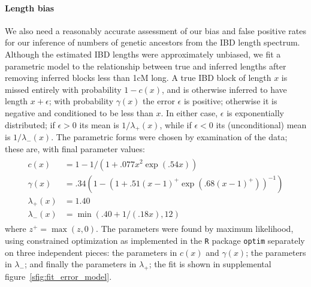 \documentclass{article}
\begin{document}
\paragraph{Length bias}
We also need a reasonably accurate assessment of our bias and false positive rates for our inference of numbers of genetic ancestors from the IBD length spectrum.
Although the estimated IBD lengths were approximately unbiased,
we fit a parametric model to the relationship between true and inferred lengths
after removing inferred blocks less than 1cM long.
A true IBD block of length $x$ is missed entirely with probability $1-c(x)$, and is otherwise inferred to have length $x+\epsilon$; 
with probability $\gamma(x)$ the error $\epsilon$ is positive; otherwise it is negative and conditioned to be less than $x$.
In either case, $\epsilon$ is exponentially distributed; if $\epsilon>0$ its mean is $1/\lambda_+(x)$, 
while if $\epsilon<0$ its (unconditional) mean is $1/\lambda_-(x)$.
The parametric forms were chosen by examination of the data;
these are, with final parameter values:
\begin{align} \label{eqn:error_model}
  \begin{split}
  c(x) &=  1 - 1/\left(1 + .077 x^2 \exp(.54 x)\right) \\
  \gamma(x) &= .34 \left( 1 - (1+ .51 (x-1)^+ \exp(.68 (x-1)^+) )^{-1} \right) \\
  \lambda_+(x) &=  1.40 \\
  \lambda_-(x) &=    \min( .40 + 1/(.18 x) , 12 ) 
\end{split}
\end{align}
where $z^+ = \max(z,0)$.
The parameters were found by maximum likelihood,
using constrained optimization as implemented in the {\tt R} package {\tt optim} \citep{R}
separately on three independent pieces:
the parameters in $c(x)$ and $\gamma(x)$;
the parameters in $\lambda_-$; 
and finally the parameters in $\lambda_+$;
the fit is shown in supplemental figure~\ref{sfig:fit_error_model}. 
\end{document}
